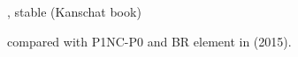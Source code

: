  \cite{bobf08}, \cite{cakp18} stable (Kanschat book)

compared with P1NC-P0 and BR element in \textcite{cakp15} (2015).
